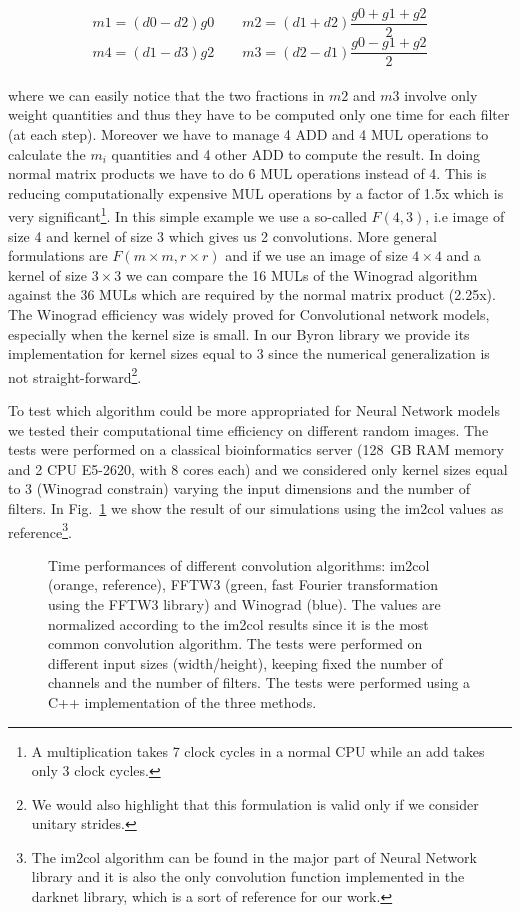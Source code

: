 \documentclass{standalone}
\begin{document}
$$
m1 = (d0 - d2)g0\quad\quad m2 = (d1 + d2)\frac{g0 + g1 + g2}{2}
$$
$$
m4 = (d1 - d3)g2\quad\quad m3 = (d2 - d1)\frac{g0 - g1 + g2}{2}
$$
\\
where we can easily notice that the two fractions in $m2$ and $m3$ involve only weight quantities and thus they have to be computed only one time for each filter (at each step).
Moreover we have to manage 4 ADD and 4 MUL operations to calculate the $m_i$ quantities and 4 other ADD to compute the result.
In doing normal matrix products we have to do 6 MUL operations instead of 4.
This is reducing computationally expensive MUL operations by a factor of 1.5x which is very significant\footnote{
  A multiplication takes 7 clock cycles in a normal CPU while an add takes only 3 clock cycles.
}.
In this simple example we use a so-called $F(4, 3)$, i.e image of size 4 and kernel of size 3 which gives us 2 convolutions.
More general formulations are $F(m\times m, r \times r)$ and if we use an image of size $4\times4$ and a kernel of size $3\times3$ we can compare the 16 MULs of the Winograd algorithm against the 36 MULs which are required by the normal matrix product (2.25x).
The Winograd efficiency was widely proved for Convolutional network models, especially when the kernel size is small.
In our Byron library we provide its implementation for kernel sizes equal to 3 since the numerical generalization is not straight-forward\footnote{
  We would also highlight that this formulation is valid only if we consider unitary strides.
}.

To test which algorithm could be more appropriated for Neural Network models we tested their computational time efficiency on different random images.
The tests were performed on a classical bioinformatics server (128~GB RAM memory and 2 CPU E5-2620, with 8 cores each) and we considered only kernel sizes equal to 3 (Winograd constrain) varying the input dimensions and the number of filters.
In Fig.~\ref{fig:winograd_timing} we show the result of our simulations using the \textsf{im2col} values as reference\footnote{
  The \textsf{im2col} algorithm can be found in the major part of Neural Network library and it is also the only convolution function implemented in the \textsf{darknet} library, which is a sort of reference for our work.
}.

\begin{figure}[htbp]
\centering
\def\svgwidth{0.8\textwidth}

\caption{Time performances of different convolution algorithms: \textsf{im2col} (orange, reference), \textsf{FFTW3} (green, fast Fourier transformation using the FFTW3 library) and \textsf{Winograd} (blue).
The values are normalized according to the \textsf{im2col} results since it is the most common convolution algorithm.
The tests were performed on different input sizes (width/height), keeping fixed the number of channels and the number of filters.
The tests were performed using a C++ implementation of the three methods.
}
\label{fig:winograd_timing}
\end{figure}
\end{document}
